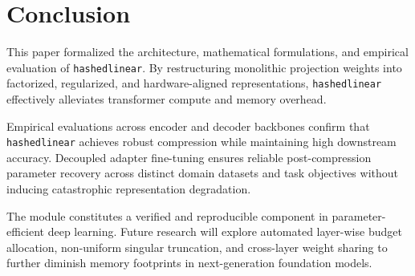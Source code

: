\section{Conclusion}
This paper formalized the architecture, mathematical formulations, and empirical evaluation of \texttt{hashedlinear}. By restructuring monolithic projection weights into factorized, regularized, and hardware-aligned representations, \texttt{hashedlinear} effectively alleviates transformer compute and memory overhead.

Empirical evaluations across encoder and decoder backbones confirm that \texttt{hashedlinear} achieves robust compression while maintaining high downstream accuracy. Decoupled adapter fine-tuning ensures reliable post-compression parameter recovery across distinct domain datasets and task objectives without inducing catastrophic representation degradation.

The module constitutes a verified and reproducible component in parameter-efficient deep learning. Future research will explore automated layer-wise budget allocation, non-uniform singular truncation, and cross-layer weight sharing to further diminish memory footprints in next-generation foundation models.
